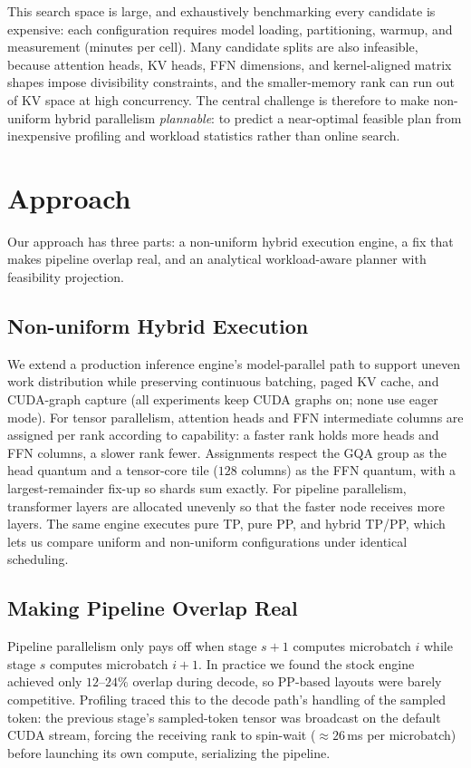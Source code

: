 \documentclass[twocolumn]{article}
\begin{document}
This search space is large, and exhaustively benchmarking every candidate is expensive: each configuration requires model loading, partitioning, warmup, and measurement (minutes per cell). Many candidate splits are also infeasible, because attention heads, KV heads, FFN dimensions, and kernel-aligned matrix shapes impose divisibility constraints, and the smaller-memory rank can run out of KV space at high concurrency. The central challenge is therefore to make non-uniform hybrid parallelism \emph{plannable}: to predict a near-optimal feasible plan from inexpensive profiling and workload statistics rather than online search.

\section{Approach}

Our approach has three parts: a non-uniform hybrid execution engine, a fix that makes pipeline overlap real, and an analytical workload-aware planner with feasibility projection.

\subsection{Non-uniform Hybrid Execution}

We extend a production inference engine's model-parallel path to support uneven work distribution while preserving continuous batching, paged KV cache, and CUDA-graph capture (all experiments keep CUDA graphs on; none use eager mode). For tensor parallelism, attention heads and FFN intermediate columns are assigned per rank according to capability: a faster rank holds more heads and FFN columns, a slower rank fewer. Assignments respect the GQA group as the head quantum and a tensor-core tile ($128$ columns) as the FFN quantum, with a largest-remainder fix-up so shards sum exactly. For pipeline parallelism, transformer layers are allocated unevenly so that the faster node receives more layers. The same engine executes pure TP, pure PP, and hybrid TP/PP, which lets us compare uniform and non-uniform configurations under identical scheduling.

\subsection{Making Pipeline Overlap Real}
\label{sec:approach-overlap}

Pipeline parallelism only pays off when stage $s{+}1$ computes microbatch $i$ while stage $s$ computes microbatch $i{+}1$. In practice we found the stock engine achieved only $12$--$24\%$ overlap during decode, so PP-based layouts were barely competitive. Profiling traced this to the decode path's handling of the sampled token: the previous stage's sampled-token tensor was broadcast on the default CUDA stream, forcing the receiving rank to spin-wait ($\approx\!26$\,ms per microbatch) before launching its own compute, serializing the pipeline.
\end{document}
